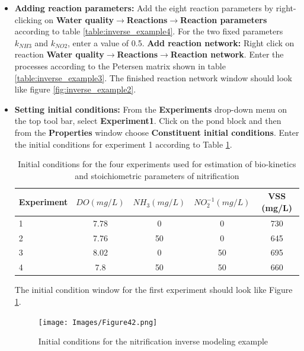 \begin{itemize}
    \item \textbf{Adding reaction parameters: } Add the eight reaction parameters by right-clicking on \textbf{Water quality}$\rightarrow$\textbf{Reactions}$\rightarrow$\textbf{Reaction parameters} according to table \ref{table:inverse_example4}. For the two fixed parameters $k_{NH3}$ and $k_{NO2}$, enter a value of 0.5. 
    \textbf{Add reaction network: } Right click on reaction  \textbf{Water quality}$\rightarrow$\textbf{Reactions}$\rightarrow$\textbf{Reaction network}. Enter the processes according to the Petersen matrix shown in table \ref{table:inverse_example3}. The finished reaction network window should look like figure \ref{fig:inverse_example2}.\\
    \item \textbf{Setting initial conditions: } From the \textbf{Experiments} drop-down menu on the top tool bar, select \textbf{Experiment1}. Click on the pond block and then from the \textbf{Properties} window choose \textbf{Constituent initial conditions}. Enter the initial conditions for experiment 1 according to Table \ref{tab:inv_ini_cond}.
   \begin{table}[]
    \centering
    \begin{tabular}{l|c c c c}
       Experiment & $DO(mg/L)$ & $NH_3(mg/L)$ & $NO_2^{-1}(mg/L)$ & VSS (mg/L) \\
    \hline
        1 & 7.78 & 0 & 0 & 730 \\
        2 & 7.76 & 50 & 0 & 645 \\
        3 & 8.02 & 0 & 50 & 695 \\
        4 & 7.8 & 50 & 50 & 660 \\
    \end{tabular}
    \caption{Initial conditions for the four experiments used for estimation of bio-kinetics and stoichiometric parameters of nitrification}
    \label{tab:inv_ini_cond}
\end{table} 
    
    The initial condition window for the first experiment should look like Figure \ref{fig:42}. 
    
\begin{figure}[!ht]
\begin{center}
\texttt{[image: Images/Figure42.png]} \\
\caption{Initial conditions for the nitrification inverse modeling example}\label{fig:42}
\end{center}
\end{figure}  


\end{itemize}
